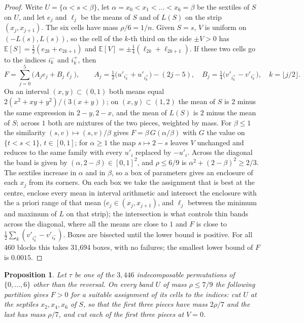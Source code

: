 \documentclass[11pt]{amsart}
\newtheorem{proposition}[theorem]{Proposition}
\theoremstyle{definition}
\theoremstyle{remark}
\numberwithin{equation}{section}
\newcommand{\E}{\mathbb{E}}
\begin{document}
\begin{proof}
Write $U=\{\alpha<s<\beta\}$, let $\alpha=x_0<x_1<\dots<x_6=\beta$ be the sextiles of $S$ on $U$, and let $e_j$ and $\ell_j$ be
the means of $S$ and of $L(S)$ on the strip $(x_j,x_{j+1})$. The six cells have mass $\rho/6=1/n$. Given $S=s$, $V$ is
uniform on $(-L(s),L(s))$, so the cell of the $k$-th third on the side $\pm V>0$ has $\E[S]=\frac12(e_{2k}+e_{2k+1})$ and
$\E[V]=\pm\frac14(\ell_{2k}+\ell_{2k+1})$. If these two cells go to the indices $i_k^-$ and $i_k^+$, then
\[
F=\sum_{j=0}^{5}\bigl(A_je_j+B_j\ell_j\bigr),\qquad A_j=\tfrac12\bigl(u'_{i_k^-}+u'_{i_k^+}\bigr)-(2j-5),\quad
B_j=\tfrac14\bigl(v'_{i_k^+}-v'_{i_k^-}\bigr),\quad k=\lfloor j/2\rfloor .
\]
On an interval $(x,y)\subset(0,1)$ both means equal $2(x^2+xy+y^2)/(3(x+y))$; on $(x,y)\subset(1,2)$ the mean of $S$ is
$2$ minus the same expression in $2-y,2-x$, and the mean of $L(S)$ is $2$ minus the mean of $S$; across $1$ both are
mixtures of the two pieces, weighted by mass. For $\beta\le1$ the similarity $(s,v)\mapsto(s,v)/\beta$ gives
$F=\beta\,G(\alpha/\beta)$ with $G$ the value on $\{t<s<1\}$, $t\in[0,1]$; for $\alpha\ge1$ the map $s\mapsto2-s$ leaves $V$
unchanged and reduces to the same family with every $u'_i$ replaced by $-u'_i$. Across the diagonal the band is given by
$(\alpha,2-\beta)\in[0,1]^2$, and $\rho\le6/9$ is $\alpha^2+(2-\beta)^2\ge2/3$. The sextiles increase in $\alpha$ and in
$\beta$, so a box of parameters gives an enclosure of each $x_j$ from its corners. On each box we take the assignment that
is best at the centre, enclose every mean in interval arithmetic and intersect the enclosure with the a priori range of
that mean ($e_j\in(x_j,x_{j+1})$, and $\ell_j$ between the minimum and maximum of $L$ on that strip); the intersection is
what controls thin bands across the diagonal, where all the means are close to $1$ and $F$ is close to
$\frac12\sum_k(v'_{i_k^+}-v'_{i_k^-})$. Boxes are bisected until the lower bound is positive. For all $460$ blocks this
takes 31{,}694 boxes, with no failures; the smallest lower bound of $F$ is $0.0015$.
\end{proof}

\begin{proposition}\label{prop:r7}
Let $\tau$ be one of the $3{,}446$ indecomposable permutations of $\{0,\dots,6\}$ other than the reversal. On every band
$U$ of mass $\rho\le7/9$ the following partition gives $F>0$ for a suitable assignment of its cells to the indices: cut
$U$ at the septiles $x_2,x_4,x_6$ of $S$, so that the first three pieces have mass $2\rho/7$ and the last has mass $\rho/7$,
and cut each of the first three pieces at $V=0$.
\end{proposition}
\end{document}
